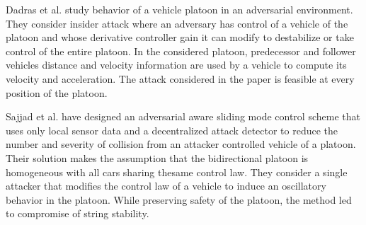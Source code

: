 Dadras et al. \cite{DGRS15} study behavior of a vehicle platoon in an adversarial environment. They consider insider attack where an adversary has control of a vehicle of the platoon and whose derivative controller gain it can modify to destabilize or take control of the entire platoon. In the considered platoon, predecessor and follower vehicles distance and velocity information are used by a vehicle to compute its velocity and acceleration. The attack considered in the paper is feasible at every position of the platoon. 

Sajjad et al. \cite{SSDSG15} have designed an adversarial aware sliding mode control scheme that uses only local sensor data and a decentralized attack detector to reduce the number and severity of collision from an attacker controlled vehicle of a platoon. Their solution makes the assumption that the bidirectional platoon is homogeneous with all cars sharing thesame control law. They consider a single attacker that modifies the control law of a vehicle to induce an oscillatory behavior in the platoon. While preserving safety of the platoon, the method led to compromise of string stability.


